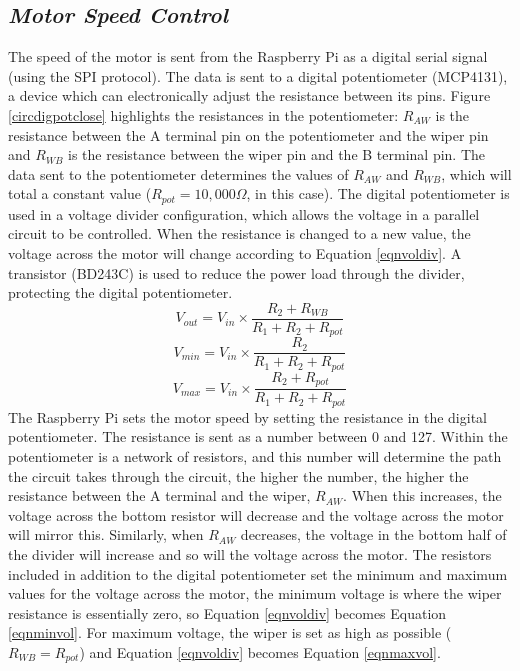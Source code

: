 \documentclass[a4]{report}
\begin{document}
	\subsection{\textit{Motor Speed Control}}
	The speed of the motor is sent from the Raspberry Pi as a digital serial signal (using the SPI protocol). The data is sent to a digital potentiometer (MCP4131), a device which can electronically adjust the resistance between its pins. Figure \ref{circdigpotclose} highlights the resistances in the potentiometer: \(R_{AW}\) is the resistance between the A terminal pin on the potentiometer and the wiper pin and \(R_{WB}\) is the resistance between the wiper pin and the B terminal pin. The data sent to the potentiometer determines the values of \(R_{AW}\) and \(R_{WB}\), which will total a constant value (\(R_{pot} = 10,000\Omega \), in this case). The digital potentiometer is used in a voltage divider configuration, which allows the voltage in a parallel circuit to be controlled. When the resistance is changed to a new value, the voltage across the motor will change according to Equation \ref{eqnvoldiv}. A transistor (BD243C) is used to reduce the power load through the divider, protecting the digital potentiometer. \newline
	\begin{equation}
		V_{out} = V_{in}\times \frac{R_2 + R_{WB}}{R_1 + R_2 + R_{pot}}
		\label{eqnvoldiv}
	\end{equation}\newline
	\begin{equation}
		V_{min} = V_{in}\times \frac{R_2}{R_1 + R_2 + R_{pot}}
		\label{eqnminvol}
	\end{equation}\newline
	\begin{equation}
		V_{max} = V_{in}\times \frac{R_2 + R_{pot}}{R_1 + R_2 + R_{pot}}
		\label{eqnmaxvol}
	\end{equation}\newline \noindent
	The Raspberry Pi sets the motor speed by setting the resistance in the digital potentiometer. The resistance is sent as a number between 0 and 127. Within the potentiometer is a network of resistors, and this number will determine the path the circuit takes through the circuit, the higher the number, the higher the resistance between the A terminal and the wiper, \(R_{AW}\). When this increases, the voltage across the bottom resistor will decrease and the voltage across the motor will mirror this. Similarly, when \(R_{AW}\) decreases, the voltage in the bottom half of the divider will increase and so will the voltage across the motor. The resistors included in addition to the digital potentiometer set the minimum and maximum values for the voltage across the motor, the minimum voltage is where the wiper resistance is essentially zero, so Equation \ref{eqnvoldiv} becomes Equation \ref{eqnminvol}. For maximum voltage, the wiper is set as high as possible (\(R_{WB} = R_{pot}\)) and Equation \ref{eqnvoldiv} becomes Equation \ref{eqnmaxvol}. \newline
\end{document}
